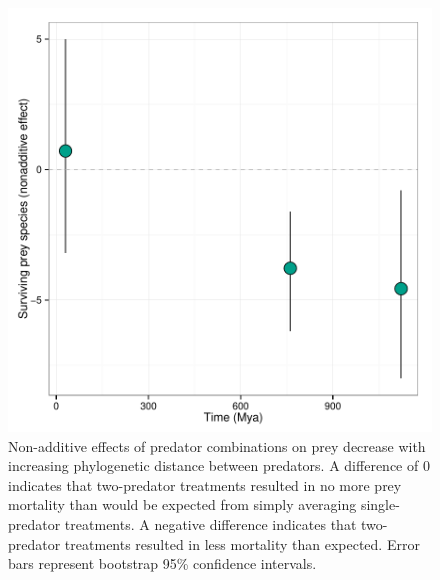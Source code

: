 \begin{figure}[htbp]
\centering
\includegraphics{figures/FIG_3.pdf}
\caption{Non-additive effects of predator combinations on prey
decrease with increasing phylogenetic distance between predators. A
difference of 0 indicates that two-predator treatments resulted in no
more prey mortality than would be expected from simply averaging
single-predator treatments. A negative difference indicates that
two-predator treatments resulted in less mortality than expected. Error
bars represent bootstrap 95\% confidence intervals.}
\end{figure}

